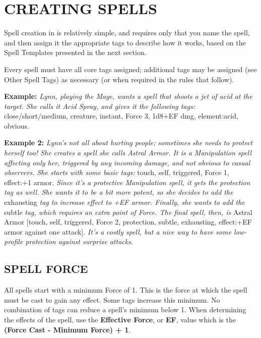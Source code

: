 \documentclass[oneside,10pt]{article}
\begin{document}
\section{CREATING SPELLS}
\begin{multicols}{2}
Spell creation in \SW{} is relatively simple, and requires
only that you name the spell, and then assign it the appropriate tags to describe how it works, based on the Spell Templates presented in the next section.

Every spell must have all core tags assigned; additional tags
may be assigned (see Other Spell Tags) as necessary (or when
required in the rules that follow).

\begin{adjustwidth*}{.5cm}{.5cm}

\textbf{Example:} \textit{Lynn, playing the Mage, wants a spell that
shoots a jet of acid at the target. She calls it Acid Spray,
and gives it the following tags:} close/short/medium, creature, instant, Force 3, 1d8+EF dmg, element:acid,
obvious.
\end{adjustwidth*}

\begin{adjustwidth*}{.5cm}{.5cm}

\textbf{Example 2:} \textit{Lynn’s not all about hurting people; sometimes she needs to protect herself too! She creates a spell
she calls Astral Armor. It is a Manipulation spell affecting
only her, triggered by any incoming damage, and not obvious to casual observers. She starts with some basic tags:}
touch, self, triggered, Force 1, effect:+1 armor. \textit{Since it’s
a protective Manipulation spell, it gets the protection tag
as well. She wants it to be a bit more potent, so she decides to add the} exhausting \textit{tag to increase effect to +EF armor.
Finally, she wants to add the} subtle\textit{ tag, which requires an
extra point of Force. The final spell, then, is} Astral Armor
[touch, self, triggered, Force 2, protection, subtle, exhausting, effect:+EF armor against one attack]. \textit{It’s a costly
spell, but a nice way to have some low-profile protection
against surprise attacks.}
\end{adjustwidth*}

\subsection{SPELL FORCE}
All spells start with a minimum Force of 1. This is the force at which the spell must be cast to gain any effect. Some tags increase this minimum. No combination of tags can reduce a spell's minimum below 1. When determining the effects of the spell, use the \textbf{Effective Force}, or \textbf{EF}, value which is the \textbf{(Force Cast - Minimum Force) + 1}. 


\end{multicols}
\end{document}
